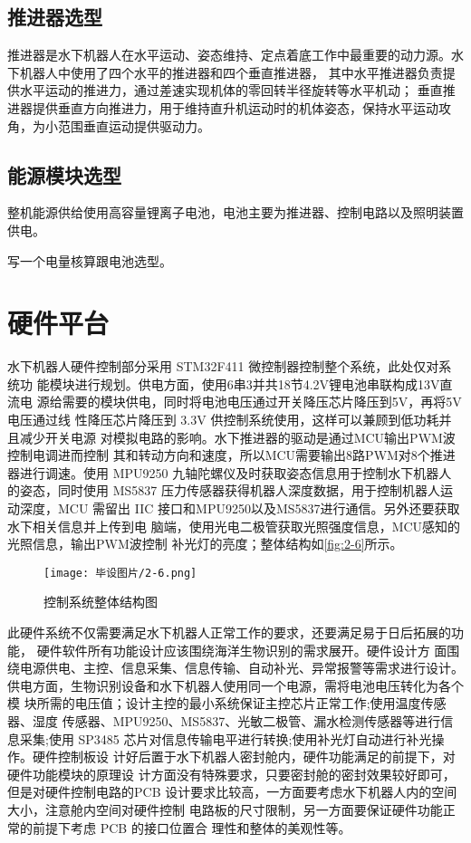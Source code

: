 \subsection{推进器选型}
推进器是水下机器人在水平运动、姿态维持、定点着底工作中最重要的动力源。水下机器人中使用了四个水平的推进器和四个垂直推进器，
其中水平推进器负责提供水平运动的推进力，通过差速实现机体的零回转半径旋转等水平机动；
垂直推进器提供垂直方向推进力，用于维持直升机运动时的机体姿态，保持水平运动攻角，为小范围垂直运动提供驱动力。
\subsection{能源模块选型}
整机能源供给使用高容量锂离子电池，电池主要为推进器、控制电路以及照明装置供电。

写一个电量核算跟电池选型。


\section{硬件平台}
水下机器人硬件控制部分采用 STM32F411 微控制器控制整个系统，此处仅对系统功
能模块进行规划。供电方面，使用6串3并共18节4.2V锂电池串联构成13V直流电
源给需要的模块供电，同时将电池电压通过开关降压芯片降压到5V，再将5V电压通过线
性降压芯片降压到 3.3V 供控制系统使用，这样可以兼顾到低功耗并且减少开关电源
对模拟电路的影响。水下推进器的驱动是通过MCU输出PWM波控制电调进而控制
其和转动方向和速度，所以MCU需要输出8路PWM对8个推进器进行调速。使用
MPU9250 九轴陀螺仪及时获取姿态信息用于控制水下机器人的姿态，同时使用
MS5837 压力传感器获得机器人深度数据，用于控制机器人运动深度，MCU 需留出
IIC 接口和MPU9250以及MS5837进行通信。另外还要获取水下相关信息并上传到电
脑端，使用光电二极管获取光照强度信息，MCU感知的光照信息，输出PWM波控制
补光灯的亮度；整体结构如\autoref{fig:2-6}所示。
\begin{figure}[htbp]
    \centering
    \texttt{[image: 毕设图片/2-6.png]}
    \caption{\label{fig:2-6}控制系统整体结构图}
\end{figure}

此硬件系统不仅需要满足水下机器人正常工作的要求，还要满足易于日后拓展的功能，
硬件软件所有功能设计应该围绕海洋生物识别的需求展开。硬件设计方
面围绕电源供电、主控、信息采集、信息传输、自动补光、异常报警等需求进行设计。
供电方面，生物识别设备和水下机器人使用同一个电源，需将电池电压转化为各个模
块所需的电压值；设计主控的最小系统保证主控芯片正常工作;使用温度传感器、湿度
传感器、MPU9250、MS5837、光敏二极管、漏水检测传感器等进行信息采集;使用
SP3485 芯片对信息传输电平进行转换;使用补光灯自动进行补光操作。硬件控制板设
计好后置于水下机器人密封舱内，硬件功能满足的前提下，对硬件功能模块的原理设
计方面没有特殊要求，只要密封舱的密封效果较好即可，但是对硬件控制电路的PCB
设计要求比较高，一方面要考虑水下机器人内的空间大小，注意舱内空间对硬件控制
电路板的尺寸限制，另一方面要保证硬件功能正常的前提下考虑 PCB 的接口位置合
理性和整体的美观性等。

